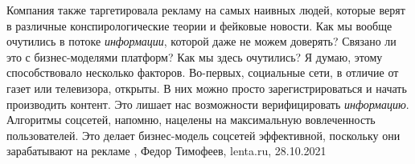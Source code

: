 Компания также таргетировала рекламу на самых наивных людей, которые верят в
различные конспирологические теории и фейковые новости. Как мы вообще очутились
в потоке \emph{информации}, которой даже не можем доверять? Связано ли это с
бизнес-моделями платформ?  Как мы здесь очутились? Я думаю, этому
способствовало несколько факторов.  Во-первых, социальные сети, в отличие от
газет или телевизора, открыты. В них можно просто зарегистрироваться и начать
производить контент. Это лишает нас возможности верифицировать
\emph{информацию}. Алгоритмы соцсетей, напомню, нацелены на максимальную
вовлеченность пользователей. Это делает бизнес-модель соцсетей эффективной,
поскольку они зарабатывают на рекламе
, 
Федор Тимофеев, lenta.ru, 28.10.2021

